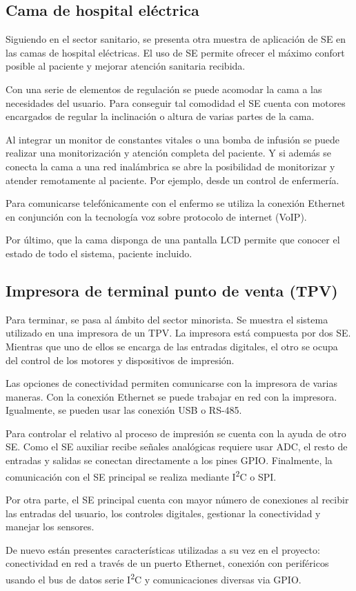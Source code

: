 \subsection{Cama de hospital eléctrica}{\label{sec:cama}}
Siguiendo en el sector sanitario, se presenta otra muestra de aplicación de SE
en las camas de hospital eléctricas. El uso de SE permite ofrecer el 
máximo confort posible al paciente y mejorar atención sanitaria recibida.

Con una serie de elementos de regulación se puede acomodar la cama a las
necesidades del usuario. Para conseguir tal comodidad el SE cuenta con motores
encargados de regular la inclinación o altura de varias partes de la cama. 

Al integrar un monitor de constantes vitales o una bomba de infusión se puede
realizar una monitorización y atención completa del paciente. Y si además se
conecta la cama a una red inalámbrica se abre la posibilidad de monitorizar
y atender remotamente al paciente. Por ejemplo, desde un control de enfermería.

Para comunicarse telefónicamente con el enfermo se utiliza la conexión
Ethernet en conjunción con la tecnología voz sobre protocolo de internet (VoIP).

Por último, que la cama disponga de una pantalla LCD permite que conocer 
 el estado de todo el sistema, paciente incluido.


\subsection{Impresora de terminal punto de venta (TPV)}{\label{sec:tpv}}
Para terminar, se pasa al ámbito del sector minorista. Se muestra el sistema
utilizado en una impresora de un TPV. La impresora está compuesta por
dos SE. Mientras que uno de ellos se encarga de las entradas digitales, el
otro se ocupa del control de los motores y dispositivos de impresión.

Las opciones de conectividad permiten comunicarse con la impresora de varias
maneras. Con la conexión Ethernet se puede trabajar en red con la impresora.
Igualmente, se pueden usar las conexión USB o RS-485.

Para controlar el  relativo al proceso de impresión
se cuenta con la ayuda de otro SE. Como el SE auxiliar recibe señales analógicas
requiere usar ADC, el resto de entradas y salidas se conectan directamente a los
pines GPIO. Finalmente, la comunicación con el SE principal se realiza mediante
I\textsuperscript{2}C o SPI.

Por otra parte, el SE principal cuenta con mayor número de conexiones al
recibir las entradas del usuario, los controles digitales, gestionar la
conectividad y manejar los sensores.

De nuevo están presentes características utilizadas a su vez en el proyecto:
conectividad en red a través de un puerto Ethernet, conexión con periféricos
usando el bus de datos serie I\textsuperscript{2}C y comunicaciones diversas via
GPIO.

